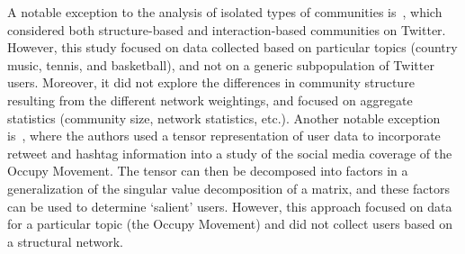 



A notable exception to the analysis of isolated types of communities is~\cite{lim2012tweets}, which considered both structure-based and interaction-based communities on Twitter. However, this study focused on data collected based on particular topics (country music, tennis, and basketball), and not on a generic subpopulation of Twitter users. Moreover, it did not explore the differences in community structure resulting from the different network weightings, and focused on aggregate statistics (community size, network statistics, etc.). Another notable exception is~\cite{kao2013talison}, where the authors used a tensor representation of user data to incorporate retweet and hashtag information into a study of the social media coverage of the Occupy Movement. The tensor can then be decomposed into factors in a generalization of the singular value decomposition of a matrix, and these factors can be used to determine `salient' users. However, this approach focused on data for a particular topic (the Occupy Movement) and did not collect users based on a structural network.